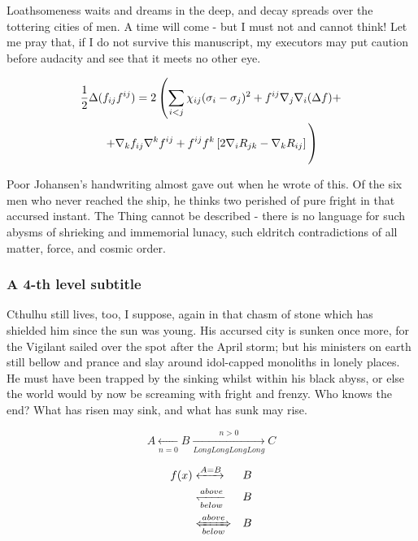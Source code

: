 Loathsomeness waits and dreams in the deep, and decay spreads over the tottering cities of men. A time will come - but I must not and cannot think! Let me pray that, if I do not survive this manuscript, my executors may put caution before audacity and see that it meets no other eye. 

\begin {multline}
  \frac {1}{2}\Delta (f_{ij}f^{ij})=
  2\left (\sum _{i<j}\chi _{ij}(\sigma _{i}-
    \sigma _{j}) ^{2}+ f^{ij}\nabla _{j}\nabla _{i}(\Delta f)+\right .\\
  \left .+\nabla _{k}f_{ij}\nabla ^{k}f^{ij}+
    f^{ij}f^{k}\left [2\nabla _{i}R_{jk}-
      \nabla _{k}R_{ij}\right ]\vphantom {\sum _{i<j}}\right )
\end{multline}

Poor Johansen's handwriting almost gave out when he wrote of this. Of the six men who never reached the ship, he thinks two perished of pure fright in that accursed instant. The Thing cannot be described - there is no language for such abysms of shrieking and immemorial lunacy, such eldritch contradictions of all matter, force, and cosmic order.

\subsubsection{A 4-th level subtitle}
\label{sec:depth4}

Cthulhu still lives, too, I suppose, again in that chasm of stone which has shielded him since the sun was young. His accursed city is sunken once more, for the Vigilant sailed over the spot after the April storm; but his ministers on earth still bellow and prance and slay around idol-capped monoliths in lonely places. He must have been trapped by the sinking whilst within his black abyss, or else the world would by now be screaming with fright and frenzy. Who knows the end? What has risen may sink, and what has sunk may rise. 

\begin{displaymath}
    A \xleftarrow[n=0]{} B \xrightarrow[LongLongLongLong]{n>0} C 
\end{displaymath}

\begin{eqnarray}
  f(x) & \xleftrightarrow[]{A=B}  & B \\
  & \xleftharpoondown[below]{above} & B \nonumber \\
  & \xLeftrightarrow[below]{above} & B
\end{eqnarray}

